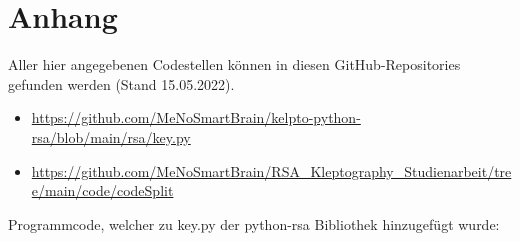 \chapter{Anhang}

Aller hier angegebenen Codestellen können in diesen GitHub-Repositories gefunden werden (Stand 15.05.2022).
\begin{itemize}
    \item \url{https://github.com/MeNoSmartBrain/kelpto-python-rsa/blob/main/rsa/key.py}
    \item \url{https://github.com/MeNoSmartBrain/RSA_Kleptography_Studienarbeit/tree/main/code/codeSplit}
\end{itemize}

Programmcode, welcher zu key.py der python-rsa Bibliothek hinzugefügt wurde:

